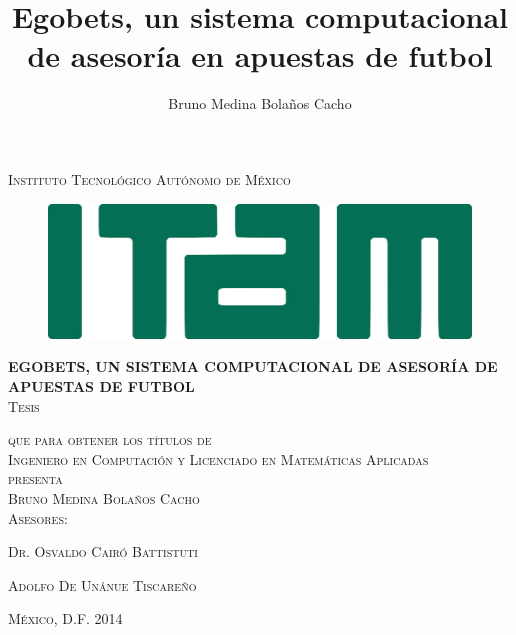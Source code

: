 
\title{Egobets, un sistema computacional de asesoría en apuestas de futbol}
\author{Bruno Medina Bolaños Cacho}

\begin{titlepage}
\begin{center}

\textsc{\Large Instituto Tecnológico Autónomo de México}\\[3em]

\begin{figure}[h]
\begin{center}
\includegraphics{resources/logo-ITAM}
\end{center}
\end{figure}

\vspace{2em}

\textsc\huge\textbf{EGOBETS, UN SISTEMA COMPUTACIONAL DE ASESORÍA DE APUESTAS DE FUTBOL}\\[3em]


\textsc{\large Tesis}

\textsc{que para obtener los títulos de}\\[1em]

\textsc{Ingeniero en Computación y Licenciado en Matemáticas Aplicadas}\\[1em]

\textsc{presenta}\\[1em]

\textsc{\Large Bruno Medina Bolaños Cacho}\\[1em]

\textsc{\large Asesores:}

\textsc{\large Dr. Osvaldo Cairó Battistuti}

\textsc{\large Adolfo De Unánue Tiscareño}\\[1em]

\end{center}

\vspace*{\fill}
\textsc{México, D.F. \hspace*{\fill} 2014}

\end{titlepage}

